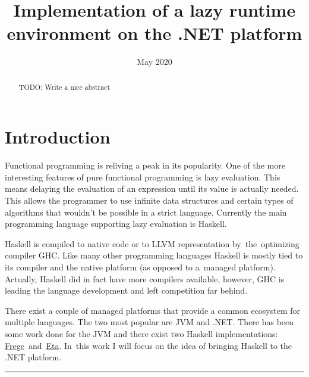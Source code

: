 \documentclass[en]{pracamgr}
\title{Implementation of a lazy runtime environment on the .NET platform}
\date{May 2020}
\begin{document}
\maketitle

\begin{abstract}
  TODO: Write a nice abstract
\end{abstract}

\tableofcontents

\chapter*{Introduction}

Functional programming is reliving a peak in its popularity.
One of the more interesting features of pure functional programming
is lazy evaluation. This means delaying the evaluation of an expression
until its value is actually needed. This allows the programmer to use
infinite data structures and certain types of algorithms that wouldn't
be possible in a strict language. Currently the main programming language
supporting lazy evaluation is Haskell.

Haskell is compiled to native code or to LLVM representation by~the~optimizing
compiler GHC. Like many other programming languages Haskell is mostly
tied to its compiler and the native platform (as opposed to a~managed platform).
Actually, Haskell did in fact have more compilers available, however,
GHC is leading the language development and left competition far behind.

There exist a couple of managed platforms that provide a common ecosystem
for multiple languages. The two most popular are JVM and .NET.
There has been some work done for the JVM \cite{Tullsen} \cite{Choi} \cite{Stewart}
and there exist two Haskell implementations: 
\href{https://github.com/Frege/frege}{Frege}~and~\href{https://eta-lang.org/}{Eta}.
In~this work I will focus on the idea of bringing
Haskell to the .NET platform.

{
    \centering \rule[3pt]{9cm}{.3pt}

}
\end{document}
